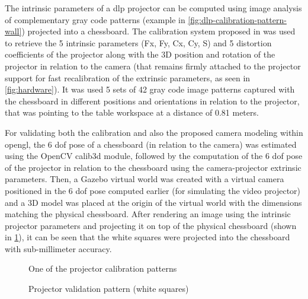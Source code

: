 The intrinsic parameters of a \gls{dlp} projector can be computed using image analysis of complementary gray code patterns (example in \cref{fig:dlp-calibration-pattern-wall}) projected into a chessboard. The calibration system proposed in \cite{Moreno2012} was used to retrieve the 5 intrinsic parameters (Fx, Fy, Cx, Cy, S) and 5 distortion coefficients of the projector along with the 3D position and rotation of the projector in relation to the camera (that remains firmly attached to the projector support for fast recalibration of the extrinsic parameters, as seen in \cref{fig:hardware}). It was used 5 sets of 42 gray code image patterns captured with the chessboard in different positions and orientations in relation to the projector, that was pointing to the table workspace at a distance of 0.81 meters.

For validating both the calibration and also the proposed camera modeling within \gls{opengl}, the 6 \gls{dof} pose of a chessboard (in relation to the camera) was estimated using the OpenCV calib3d module, followed by the computation of the 6 \gls{dof} pose of the projector in relation to the chessboard using the camera-projector extrinsic parameters. Then, a Gazebo virtual world was created with a virtual camera positioned in the 6 \gls{dof} pose computed earlier (for simulating the video projector) and a 3D model was placed at the origin of the virtual world with the dimensions matching the physical chessboard. After rendering an image using the intrinsic projector parameters and projecting it on top of the physical chessboard (shown in \cref{fig:dlp-projected-chessboard}), it can be seen that the white squares were projected into the chessboard with sub-millimeter accuracy.

\begin{figure}[H]
	\begin{floatrow}[2]
		{\caption{One of the projector calibration patterns}\label{fig:dlp-calibration-pattern-wall}}
		{\caption{Projector validation pattern (white squares)}\label{fig:dlp-projected-chessboard}}
	\end{floatrow}
\end{figure}



